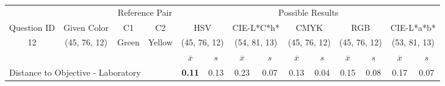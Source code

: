 \begin{table}[H]
  \resizebox{\textwidth}{!} {
  \begin{tabular}{lccccccccccccc}
    \hline
    \multicolumn{1}{c}{}                              &                                      & \multicolumn{2}{c}{Reference Pair}                   & \multicolumn{10}{c}{Possible Results}                                                                                                                                                                                                                                                                                        \\ \cline{3-14}
    \multicolumn{1}{c}{\multirow{-2}{*}{Question ID}} & \multirow{-2}{*}{Given Color}        & C1                       & C2                         & \multicolumn{2}{c}{HSV}                                        & \multicolumn{2}{c}{CIE-L*C*h*}                                 & \multicolumn{2}{c}{CMYK}                                       & \multicolumn{2}{c}{RGB}                                        & \multicolumn{2}{c}{CIE-L*a*b*}                                 \\ \hline
    \multicolumn{1}{c}{12}                             & \cellcolor[HTML]{80FF00}(45, 76, 12) & \multicolumn{1}{c|}{Green} & \multicolumn{1}{c|}{Yellow}  & \multicolumn{2}{c|}{\cellcolor[HTML]{80FF00}(45, 76, 12)}      & \multicolumn{2}{c|}{\cellcolor[HTML]{B1FF00}(54, 81, 13)}       & \multicolumn{2}{c|}{\cellcolor[HTML]{80FF00}(45, 76, 12)}       & \multicolumn{2}{c|}{\cellcolor[HTML]{80FF00}(45, 76, 12)}       & \multicolumn{2}{c|}{\cellcolor[HTML]{AEFF00}(53, 81, 13)}       \\ \hline
                                                      & \multicolumn{1}{l}{}                 & \multicolumn{1}{l}{}     & \multicolumn{1}{l}{}       & \multicolumn{1}{c}{$\overline{x}$} & \multicolumn{1}{c}{$s$} & \multicolumn{1}{c}{$\overline{x}$} & \multicolumn{1}{c}{$s$} & \multicolumn{1}{c}{$\overline{x}$} & \multicolumn{1}{c}{$s$} & \multicolumn{1}{c}{$\overline{x}$} & \multicolumn{1}{c}{$s$} & \multicolumn{1}{c}{$\overline{x}$} & \multicolumn{1}{c}{$s$} \\ \hline
    \multicolumn{4}{l}{Distance to Objective - Laboratory}                                                                                           & \multicolumn{1}{|c}{\textbf{0.11}}       & \multicolumn{1}{c|}{0.13}    & \multicolumn{1}{|c}{0.23}       & \multicolumn{1}{c|}{0.07}    & \multicolumn{1}{|c}{0.13}       & \multicolumn{1}{c|}{0.04}    & \multicolumn{1}{|c}{0.15}       & \multicolumn{1}{c|}{0.08}    & \multicolumn{1}{|c}{0.17}       & \multicolumn{1}{c|}{0.07}    \\

\end{tabular}}
\end{table}
